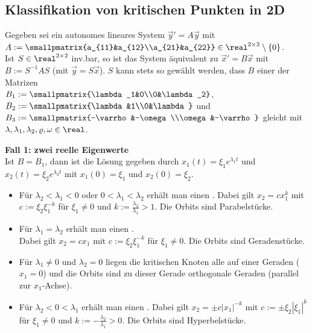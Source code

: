 \pagebreak

\subsection{%
    Klassifikation von kritischen Punkten in 2D%
}

Gegeben sei ein autonomes lineares System $\vec{y}' = A\vec{y}$ mit
$A := \smallpmatrix{a_{11}&a_{12}\\a_{21}&a_{22}} \in \real^{2 \times 2} \setminus \{0\}$.\\
Ist $S \in \real^{2 \times 2}$ inv.bar, so ist das System äquivalent zu
$\vec{x}' = B\vec{x}$ mit $B := S^{-1} AS$ (mit $\vec{y} = S\vec{x}$).
$S$ kann stets so gewählt werden, dass $B$ einer der Matrizen\\
$B_1 := \smallpmatrix{\lambda_1&0\\0&\lambda_2}$,
$B_2 := \smallpmatrix{\lambda&1\\0&\lambda}$ und
$B_3 := \smallpmatrix{-\varrho&-\omega\\\omega&-\varrho}$
gleicht mit $\lambda, \lambda_1, \lambda_2, \varrho, \omega \in \real$.

\textbf{Fall 1: zwei reelle Eigenwerte}\\
Ist $B = B_1$, dann ist die Lösung gegeben durch $x_1(t) = \xi_1 e^{\lambda_1 t}$ und
$x_2(t) = \xi_2 e^{\lambda_2 t}$ mit $x_1(0) = \xi_1$ und $x_2(0) = \xi_2$.
\begin{itemize}
    \item
    Für $\lambda_2 < \lambda_1 < 0$ oder $0 < \lambda_1 < \lambda_2$
    erhält man einen .
    Dabei gilt $x_2 = cx_1^k$ mit
    $c := \xi_2 \xi_1^{-k}$ für $\xi_1 \not= 0$
    und $k := \frac{\lambda_2}{\lambda_1} > 1$.
    Die Orbits sind Parabelstücke.

    \item
    Für $\lambda_1 = \lambda_2$ erhält man einen
    .\\
    Dabei gilt $x_2 = cx_1$ mit $c := \xi_2 \xi_1^{-k}$ für $\xi_1 \not= 0$.
    Die Orbits sind Geradenstücke.

    \item
    Für $\lambda_1 \not= 0$ und $\lambda_2 = 0$ liegen die kritischen Knoten alle auf
    einer Geraden ($x_1 = 0$) und die Orbits sind zu dieser Gerade orthogonale Geraden
    (parallel zur $x_1$-Achse).

    \item
    Für $\lambda_2 < 0 < \lambda_1$ erhält man einen .
    Dabei gilt $x_2 = \pm c|x_1|^{-k}$ mit
    $c := \pm\xi_2 |\xi_1|^k$ für $\xi_1 \not= 0$
    und $k := -\frac{\lambda_2}{\lambda_1} > 0$.
    Die Orbits sind Hyperbelstücke.
\end{itemize}


